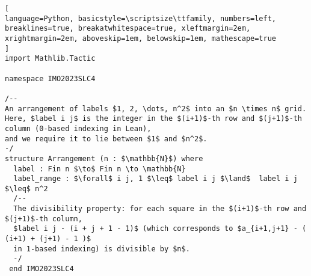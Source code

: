 \begin{tcolorbox}[enhanced, breakable, rounded corners,
    colback=green!5!white, colframe=green!75!black,
    colbacktitle=green!85!black, fonttitle=\bfseries, coltitle=white, title=Lean Theorem for 2023 IMO Shortlist Combinatorics Problem 4]
\setlength{\parskip}{1em}
\begin{lstlisting}[
language=Python, basicstyle=\scriptsize\ttfamily, numbers=left, breaklines=true, breakatwhitespace=true, xleftmargin=2em, xrightmargin=2em, aboveskip=1em, belowskip=1em, mathescape=true
]
import Mathlib.Tactic

namespace IMO2023SLC4

/--
An arrangement of labels $1, 2, \dots, n^2$ into an $n \times n$ grid.
Here, $label i j$ is the integer in the $(i+1)$-th row and $(j+1)$-th column (0-based indexing in Lean),
and we require it to lie between $1$ and $n^2$.
-/
structure Arrangement (n : $\mathbb{N}$) where
  label : Fin n $\to$ Fin n \to \mathbb{N}
  label_range : $\forall$ i j, 1 $\leq$ label i j $\land$  label i j $\leq$ n^2
  /--
  The divisibility property: for each square in the $(i+1)$-th row and $(j+1)$-th column,
  $label i j - (i + j + 1 - 1)$ (which corresponds to $a_{i+1,j+1} - ( (i+1) + (j+1) - 1 )$
  in 1-based indexing) is divisible by $n$.
  -/
 end IMO2023SLC4
\end{lstlisting}
\end{tcolorbox}

